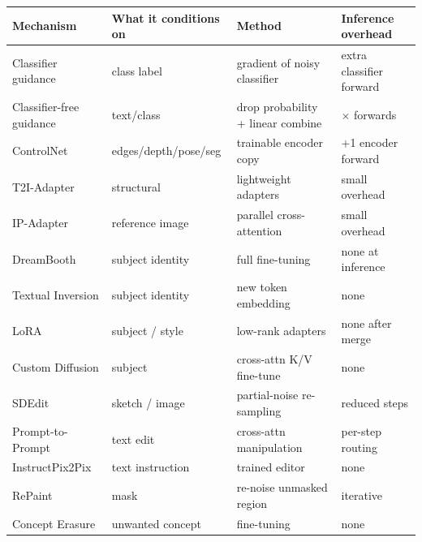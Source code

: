 {\def\LTcaptype{none} %
\begin{longtable}[]{@{}
  >{\raggedright\arraybackslash}p{}
  >{\raggedright\arraybackslash}p{}
  >{\raggedright\arraybackslash}p{}
  >{\raggedright\arraybackslash}p{}@{}}
\toprule\noalign{}
\begin{minipage}[b]{\linewidth}\raggedright
Mechanism
\end{minipage} & \begin{minipage}[b]{\linewidth}\raggedright
What it conditions on
\end{minipage} & \begin{minipage}[b]{\linewidth}\raggedright
Method
\end{minipage} & \begin{minipage}[b]{\linewidth}\raggedright
Inference overhead
\end{minipage} \\
\midrule\noalign{}
\endhead
\bottomrule\noalign{}
\endlastfoot
Classifier guidance & class label & gradient of noisy classifier & extra classifier forward \\
Classifier-free guidance & text/class & drop probability + linear combine & 2× forwards \\
ControlNet & edges/depth/pose/seg & trainable encoder copy & +1 encoder forward \\
T2I-Adapter & structural & lightweight adapters & small overhead \\
IP-Adapter & reference image & parallel cross-attention & small overhead \\
DreamBooth & subject identity & full fine-tuning & none at inference \\
Textual Inversion & subject identity & new token embedding & none \\
LoRA & subject / style & low-rank adapters & none after merge \\
Custom Diffusion & subject & cross-attn K/V fine-tune & none \\
SDEdit & sketch / image & partial-noise re-sampling & reduced steps \\
Prompt-to-Prompt & text edit & cross-attn manipulation & per-step routing \\
InstructPix2Pix & text instruction & trained editor & none \\
RePaint & mask & re-noise unmasked region & iterative \\
Concept Erasure & unwanted concept & fine-tuning & none \\
\end{longtable}
}

